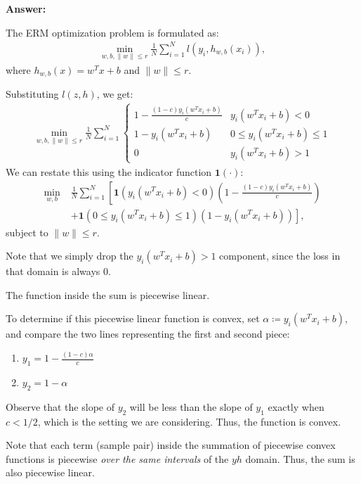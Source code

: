 \documentclass{article}
\begin{document}
\textbf{Answer:}

The ERM optimization problem is formulated as:
\begin{align*}
    \min_{w, b, \|w\| \leq r} \frac{1}{N} \sum_{i=1}^{N} l(y_i, h_{w,b}(x_i)),
\end{align*}
where \( h_{w, b}(x) = w^T x + b \) and \( \| w \| \leq r \).

Substituting \( l(z, h) \), we get:
\begin{align*}
    \min_{w, b, \|w\| \leq r} \frac{1}{N} \sum_{i=1}^{N} \begin{cases}
        1 - \frac{(1 - c) y_i (w^T x_i + b)}{c} & y_i (w^T x_i + b) < 0 \\
        1 - y_i (w^T x_i + b) & 0 \leq y_i (w^T x_i + b) \leq 1 \\
        0 & y_i (w^T x_i + b) > 1
    \end{cases}
\end{align*}
We can restate this using the indicator function \( \mathbf{1}(\cdot) \):
\begin{align*}
    \min_{w, b} \; & \frac{1}{N} \sum_{i=1}^{N} \left[\mathbf{1}(y_i (w^T x_i + b) < 0) \left(1 - \frac{(1 - c) y_i (w^T x_i + b)}{c}\right) \right. \\
    &\left. + \mathbf{1}(0 \leq y_i (w^T x_i + b) \leq 1) (1 - y_i (w^T x_i + b))\right],
\end{align*}
subject to \( \| w \| \leq r \).

Note that we simply drop the $y_i (w^T x_i + b) > 1$ component, since the loss in that domain is always 0.

The function inside the sum is piecewise linear.

To determine if this piecewise linear function is convex, set $\alpha \coloneqq y_i (w^T x_i + b)$, and compare the two lines representing the first and second piece:
\begin{enumerate}
    \item $y_1 = 1 - \frac{(1 - c)\alpha}{c}$
    \item $y_2 = 1 - \alpha$
\end{enumerate}
Observe that the slope of $y_2$ will be less than the slope of $y_1$ exactly when $c < 1/2$, which is the setting we are considering.
Thus, the function is convex.

Note that each term (sample pair) inside the summation of piecewise convex functions is piecewise \textit{over the same intervals} of the $yh$ domain.
Thus, the sum is also piecewise linear.
\end{document}
